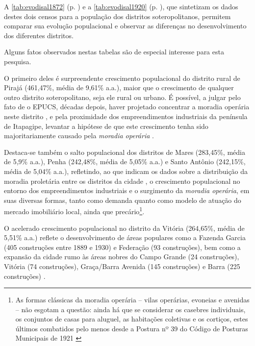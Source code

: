 A \autoref{tab:evodisal1872} (p. \pageref{tab:evodisal1872}) e a \autoref{tab:evodisal1920} (p. \pageref{tab:evodisal1920}), que sintetizam os dados destes dois censos para a população dos distritos soteropolitanos, permitem comparar sua evolução populacional e observar as diferenças no desenvolvimento dos diferentes distritos. 




Alguns fatos observados nestas tabelas são de especial interesse para esta pesquisa.

O primeiro deles é surpreendente crescimento populacional do distrito rural de Pirajá (461,47\%, média de 9,61\% a.a.), maior que o crescimento de qualquer outro distrito soteropolitano, seja ele rural ou urbano. É possível, a julgar pelo fato de o EPUCS, décadas depois, haver projetado concentrar a moradia operária neste distrito \cite{PREFEITURA1978,sampaio_formas_1999}, e pela proximidade dos empreendimentos industriais da península de Itapagipe, levantar a hipótese de que este crescimento tenha sido majoritariamente causado pela \textit{moradia operária} \cite{cardoso_vilas_1991}.

Destaca-se também o salto populacional dos distritos de Mares (283,45\%, média de 5,9\% a.a.), Penha (242,48\%, média de 5,05\% a.a.) e Santo Antônio (242,15\%, média de 5,04\% a.a.), refletindo, ao que indicam os dados sobre a distribuição da moradia proletária entre os distritos da cidade \cite[p.~126]{cardoso_vilas_1991}, o crescimento populacional no entorno dos empreendimentos industriais e o surgimento da \textit{moradia operária}, em suas diversas formas, tanto como demanda quanto como modelo de atuação do mercado imobiliário local, ainda que precário\footnote{As formas clássicas da moradia operária -- vilas operárias, evoneias e avenidas -- não esgotam a questão: ainda há que se considerar os casebres individuais, os conjuntos de casas para aluguel, as habitações coletivas e os cortiços, estes últimos combatidos pelo menos desde a Postura nº 39 do Código de Posturas Municipais de 1921 \cite{PREFEITURA1921}}.

O acelerado crescimento populacional no distrito da Vitória (264,65\%, média de 5,51\% a.a.) reflete o desenvolvimento de áreas populares como a Fazenda Garcia (405 construções entre 1889 e 1930) e Federação (93 construções), bem como a expansão da cidade rumo às áreas nobres do Campo Grande (24 construções), Vitória (74 construções), Graça/Barra Avenida (145 construções) e Barra (225 construções) \cite[p.~295]{almeida_victoria_1997}.


